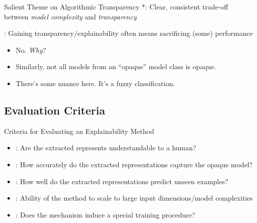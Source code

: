 \documentclass[11pt,dvipsnames,usenames,aspectratio=169]{beamer}  %
\begin{document}
\begin{frame}{Salient Theme on Algorithmic Transparency}
  *:  Clear, consistent trade-off between \textit{model complexity} and \textit{transparency}

  \vspace{16pt}
  \textbf{}: Gaining transparency/explainability often means sacrificing (some) performance

  \vspace{16pt}
  \begin{itemize}[<+->]
    \item No.  \textit{Why}?
    \item Similarly, not all models from an ``opaque'' model class is opaque.
    \item There's some nuance here.  It's a fuzzy classification.
  \end{itemize}

\end{frame}

\subsection{Evaluation Criteria}

\begin{frame}{Criteria for Evaluating an Explainability Method}
  \begin{itemize}[<+->]
    \setlength{\itemsep}{19pt}
    \item {}: Are the extracted represents understandable to a human?
    \item {}: How accurately do the extracted representations capture the opaque model?
    \item {}: How well do the extracted representations predict unseen examples?
    \item {}: Ability of the method to scale to large input dimensions/model complexities
    \item {}: Does the mechanism induce a special training procedure?
  \end{itemize}
\end{frame}
\end{document}
